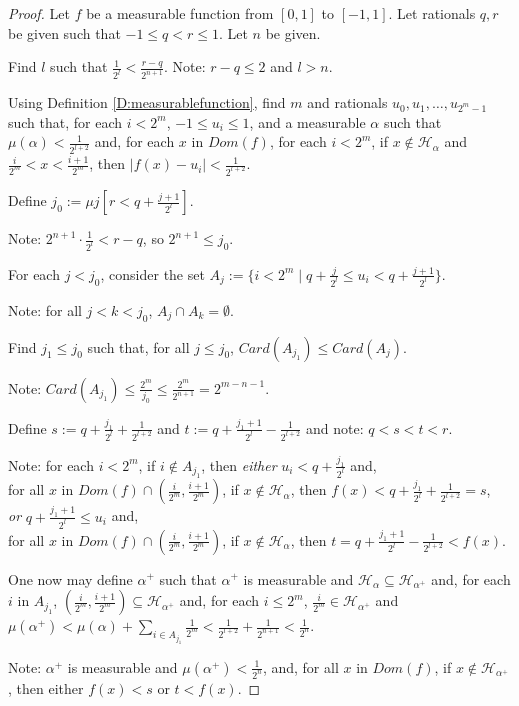 \documentclass[a4paper]{amsart}
\theoremstyle{plain}
\begin{document}
\begin{proof}Let $f$ be a measurable function from $[0,1]$ to $[-1,1]$. Let rationals $q,r$ be given such that $-1\le q < r\le 1$. Let $n$ be given.

\smallskip Find $l$ such that $\frac{1}{2^l}<\frac{r-q}{2^{n+1}}$. Note: $r-q\le 2$ and $l> n$. 



Using Definition \ref{D:measurablefunction}, find $m$ and rationals $u_0, u_1, \ldots, u_{2^m-1}$ such that, for each $i<2^m$, $-1\le u_i\le 1$, and  a measurable $\alpha$ such that $\mu(\alpha)<\frac{1}{2^{l+2}}$ and, for each $x$ in $Dom(f)$, for each $i<2^m$, if $x\notin \mathcal{H}_\alpha$ and $\frac{i}{2^m}< x < \frac{i+1}{2^m}$, then $|f(x)-u_i|<\frac{1}{2^{l+2}}$.

Define $j_0:=\mu j[r<q+\frac{j+1}{2^l}]$. 

Note: $2^{n+1}\cdot\frac{1}{2^l}< r-q$, so $2^{n+1}\le j_0$. 

For each $j< j_0$,  consider the set $A_j:=\{i<2^m\mid q+\frac{j}{2^l}\le u_i < q+\frac{j+1}{2^l}\}$.

   
Note: for all $j<k< j_0$, $A_j\cap A_k = \emptyset$.


Find $j_1\le j_0$ such that, for all $j\le j_0$, $Card(A_{j_1})\le Card(A_j)$.

Note: $Card(A_{j_1})\le \frac{2^m}{j_0}\le\frac{2^m}{2^{n+1}}=2^{m-n-1}$.

Define $s:= q+\frac{j_1}{2^l}+\frac{1}{2^{l+2}}$ and $t:=q+\frac{j_1+1}{2^l}-\frac{1}{2^{l+2}}$ and note: $q<s<t<r$.

Note: for each $i<2^m$, if $i\notin A_{j_1}$, then {\it either} $u_i<q+\frac{j_1}{2^l}$ and,\\ for all $x$ in $Dom(f)\cap (\frac{i}{2^m}, \frac{i+1}{2^m})$, if $x\notin \mathcal{H}_\alpha$, then $f(x)< q+\frac{j_1}{2^l}+\frac{1}{2^{l+2}} = s$,
\\{\it or} $q+\frac{j_1+1}{2^l}\le u_i$ and, \\
for all $x$ in $Dom(f)\cap (\frac{i}{2^m}, \frac{i+1}{2^m})$, if $x \notin \mathcal{H}_\alpha$, then  $t= q+\frac{j_1+1}{2^l}-\frac{1}{2^{l+2}}< f(x) $.
 
\smallskip One now may  define $\alpha^+$ such that $\alpha^+$ is measurable and $\mathcal{H}_\alpha\subseteq \mathcal{H}_{\alpha^+}$ and, for each $i$ in $A_{j_1}$, $(\frac{i}{2^m}, \frac{i+1}{2^m})\subseteq \mathcal{H}_{\alpha^+}$ and, for each $i\le 2^m$, $\frac{i}{2^m}\in \mathcal{H}_{\alpha^+}$ and \\$\mu(\alpha^+)<\mu(\alpha) + \sum_{i\in A_{j_1}} \frac{1}{2^m}<\frac{1}{2^{l+2}} + \frac{1}{2^{n+1}}< \frac{1}{2^n}$.  

 
 
 Note: $\alpha^+$ is measurable and $\mu(\alpha^+)<\frac{1}{2^n}$, and, for all $x$ in $Dom(f)$, if $x\notin \mathcal{H}_{\alpha^+}$, then either $f(x)<s$ or $t<f(x)$. 

 \end{proof}
 
\end{document}
